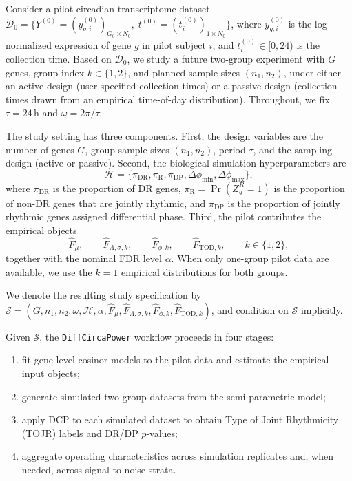 \documentclass{article}
\newcommand{\software}[1]{\texttt{#1}}
\begin{document}
Consider a pilot circadian transcriptome dataset
\(\mathcal{D}_0=\{Y^{(0)}=(y^{(0)}_{g,i})_{G_0\times N_0},\;
t^{(0)}=(t_i^{(0)})_{1\times N_0}\}\),
where $y^{(0)}_{g,i}$ is the log-normalized expression of gene $g$ in pilot
subject $i$, and $t_i^{(0)}\in[0,24)$ is the collection time.
Based on $\mathcal{D}_0$, we study a future two-group experiment with $G$
genes, group index $k\in\{1,2\}$, and planned sample sizes $(n_1,n_2)$,
under either an active design (user-specified collection times) or a passive
design (collection times drawn from an empirical time-of-day distribution).
Throughout, we fix $\tau=24$\,h and $\omega=2\pi/\tau$.

The study setting has three components. First, the design variables are the
number of genes $G$, group sample sizes $(n_1,n_2)$, period $\tau$, and the
sampling design (active or passive). Second, the biological simulation
hyperparameters are
\[
\mathcal{H}
=
\{\pi_{\mathrm{DR}},\pi_{\mathrm{R}},\pi_{\mathrm{DP}},
\Delta\phi_{\min},\Delta\phi_{\max}\},
\]
where $\pi_{\mathrm{DR}}$ is the proportion of DR genes,
$\pi_{\mathrm{R}}=\Pr(Z_g^R=1)$ is the proportion of non-DR genes that are jointly
rhythmic, and $\pi_{\mathrm{DP}}$ is the proportion of jointly rhythmic genes
assigned differential phase. Third, the pilot contributes the empirical objects
\[
\hat{F}_\mu,\qquad
\hat{F}_{A,\sigma,k},\qquad
\hat{F}_{\phi,k},\qquad
\hat{F}_{\mathrm{TOD},k},
\qquad k\in\{1,2\},
\]
together with the nominal FDR level $\alpha$. When only one-group pilot data
are available, we use the $k=1$ empirical distributions for both groups.

We denote the resulting study specification by
\(\mathcal{S}=(G,n_1,n_2,\omega,\mathcal{H},\alpha,\hat{F}_\mu,
\hat{F}_{A,\sigma,k},\hat{F}_{\phi,k},\hat{F}_{\mathrm{TOD},k})\),
and condition on $\mathcal{S}$ implicitly.

Given $\mathcal{S}$, the \software{DiffCircaPower} workflow proceeds in four
stages:
\begin{enumerate}
\item fit gene-level cosinor models to the pilot data and estimate the
empirical input objects;
\item generate simulated two-group datasets from the semi-parametric model;
\item apply DCP to each simulated dataset to obtain Type of Joint Rhythmicity
(TOJR) labels and DR/DP $p$-values;
\item aggregate operating characteristics across simulation replicates and, when
needed, across signal-to-noise strata.
\end{enumerate}
\end{document}
